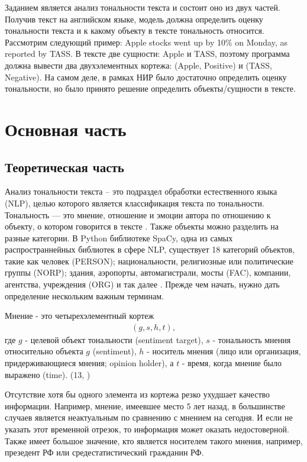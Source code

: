 Заданием является анализ тональности текста и состоит оно из двух частей. Получив текст на английском языке, модель должна определить оценку тональности текста и к какому объекту в тексте тональность относится. Рассмотрим следующий пример: \flqq Apple stocks went up by 10\% on Monday, as reported by TASS\frqq. В тексте две сущности: \flqq Apple\frqq \vspace{1pt} и \flqq TASS\frqq, поэтому программа должна вывести два двухэлементных кортежа: (Apple, Positive) и (TASS, Negative). На самом деле, в рамках НИР было достаточно определить оценку тональности, но было принято решение определить объекты/сущности в тексте.  

\section{Основная часть} 
\subsection{Теоретическая часть}


Анализ тональности текста – это подраздел обработки естественного языка (NLP), целью которого является классификация текста по тональности. Тональность — это мнение, отношение и эмоции автора по отношению к объекту, о котором говорится в тексте \cite{Samigulin2021}. Также объекты можно разделить на разные категории. В Python библиотеке SpaCy, одна из самых распространнейных библиотек в сфере NLP, существует 18 категорий объектов, такие как человек (PERSON); национальности, религиозные или политические группы (NORP); здания, аэропорты, автомагистрали, мосты (FAC), компании, агентства, учреждения (ORG) и так далее \cite{spaCy}. 
Прежде чем начать, нужно дать определение нескольким важным терминам.

\begin{definition}
    Мнение - это четырехэлементный кортеж
    \begin{align*}
        (g, s, h, t),
    \end{align*}
    где $g$ - целевой объект тональности (sentiment target), $s$ - тональность мнения относительно объекта $g$ (sentiment), $h$ - носитель мнения (лицо или организация, придерживающиеся мнения; opinion holder), а $t$ - время, когда мнение было выражено (time). (13, \cite{10.5555/3110802})
\end{definition}

Отсутствие хотя бы одного элемента из кортежа резко ухудшает качество информации. Например, мнение, имеевшее место 5 лет назад, в большинстве случаев является  неактуальным по сравнению с мнением на сегодня. И если не указать этот временной отрезок, то информация может оказать недостоверной. Также имеет большое значение, кто является носителем такого мнения, например, презедент РФ или средестатистический гражданин РФ.


